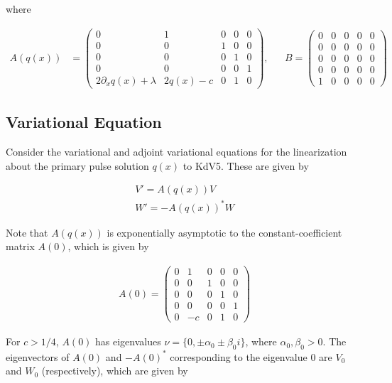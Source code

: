 \documentclass[12pt]{article}
\begin{document}
where

\begin{align*}
A(q(x)) &= \begin{pmatrix}0 & 1 & 0 & 0 & 0 \\0 & 0 & 1 & 0 & 0 \\0 & 0 & 0 & 1 & 0 \\0 & 0 & 0 & 0 & 1 \\
2 \partial_x q(x) + \lambda & 2 q(x) - c & 0 & 1 & 0 \end{pmatrix}, &&
B = \begin{pmatrix}0 & 0 & 0 & 0 & 0 \\0 & 0 & 0 & 0 & 0 \\0  & 0 & 0 & 0 & 0 \\0 & 0 & 0 & 0 & 0 \\1 & 0 & 0 & 0 & 0 \end{pmatrix} 
\end{align*}

\subsection{Variational Equation}

Consider the variational and adjoint variational equations for the linearization about the primary pulse solution $q(x)$ to KdV5. These are given by

\begin{align}
V' = A(q(x))V \label{vareq} \\
W' = -A(q(x))^*W \label{adjvareq}
\end{align}

Note that $A(q(x))$ is exponentially asymptotic to the constant-coefficient matrix $A(0)$, which is given by

\begin{align}\label{A0}
A(0) = \begin{pmatrix}0 & 1 & 0 & 0 & 0 \\ 0 & 0 & 1 & 0 & 0 \\ 0 & 0 & 0 & 1 & 0 \\ 0 & 0 & 0 & 0 & 1 \\
0 & -c & 0 & 1 & 0 
\end{pmatrix}
\end{align}

For $c > 1/4$, $A(0)$ has eigenvalues $\nu = \{ 0, \pm \alpha_0 \pm \beta_0 i\}$, where $\alpha_0, \beta_0 > 0$. The eigenvectors of $A(0)$ and $-A(0)^*$ corresponding to the eigenvalue 0 are $V_0$ and $W_0$ (respectively), which are given by
\end{document}
